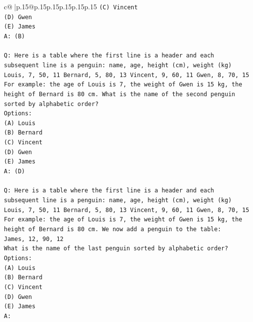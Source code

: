 \documentclass{article}
\begin{document}
{\begin{supertabular}{c@{$\;$}|p{.15\linewidth}@{}p{.15\linewidth}p{.15\linewidth}p{.15\linewidth}p{.15\linewidth}p{.15\linewidth}}
{{{\texttt{(C) Vincent} \\
\texttt{(D) Gwen} \\
\texttt{(E) James} \\
\texttt{A: (B)} \\
\\ 
\texttt{Q: Here is a table where the first line is a header and each subsequent line is a penguin:  name, age, height (cm), weight (kg) Louis, 7, 50, 11 Bernard, 5, 80, 13 Vincent, 9, 60, 11 Gwen, 8, 70, 15  For example: the age of Louis is 7, the weight of Gwen is 15 kg, the height of Bernard is 80 cm.  What is the name of the second penguin sorted by alphabetic order?} \\
\texttt{Options:} \\
\texttt{(A) Louis} \\
\texttt{(B) Bernard} \\
\texttt{(C) Vincent} \\
\texttt{(D) Gwen} \\
\texttt{(E) James} \\
\texttt{A: (D)} \\
\\ 
\texttt{Q: Here is a table where the first line is a header and each subsequent line is a penguin:  name, age, height (cm), weight (kg) Louis, 7, 50, 11 Bernard, 5, 80, 13 Vincent, 9, 60, 11 Gwen, 8, 70, 15  For example: the age of Louis is 7, the weight of Gwen is 15 kg, the height of Bernard is 80 cm.  We now add a penguin to the table:} \\
\texttt{James, 12, 90, 12} \\
\texttt{What is the name of the last penguin sorted by alphabetic order?} \\
\texttt{Options:} \\
\texttt{(A) Louis} \\
\texttt{(B) Bernard} \\
\texttt{(C) Vincent} \\
\texttt{(D) Gwen} \\
\texttt{(E) James} \\
\texttt{A:} \\
            }
        }
    }
     \\ \\


\end{supertabular}}
\end{document}
